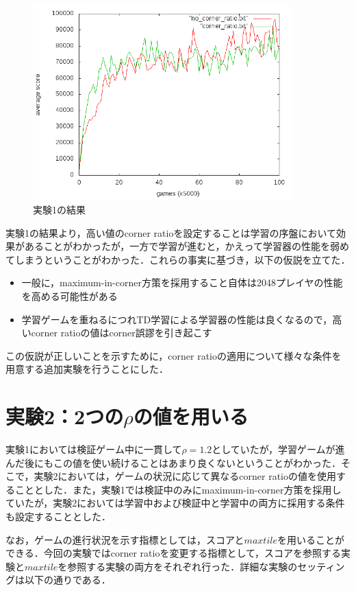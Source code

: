 \documentclass{suribt}
\begin{document}
\begin{figure}[t]
	\begin{center}
	\includegraphics[width=10cm]{figure_006.png}
	\caption{実験1の結果}
	\label{figure_006}
	\end{center}
\end{figure}

実験1の結果より，高い値のcorner ratioを設定することは学習の序盤において効果があることがわかったが，一方で学習が進むと，かえって学習器の性能を弱めてしまうということがわかった．これらの事実に基づき，以下の仮説を立てた．

\begin{itemize}
\item 一般に，maximum-in-corner方策を採用すること自体は2048プレイヤの性能を高める可能性がある
\item 学習ゲームを重ねるにつれTD学習による学習器の性能は良くなるので，高いcorner ratioの値はcorner誤謬を引き起こす
\end{itemize}

この仮説が正しいことを示すために，corner ratioの適用について様々な条件を用意する追加実験を行うことにした．

\section{実験2：2つの${\rho}$の値を用いる}
実験1においては検証ゲーム中に一貫して${\rho}=1.2$としていたが，学習ゲームが進んだ後にもこの値を使い続けることはあまり良くないということがわかった．そこで，実験2においては，ゲームの状況に応じて異なるcorner ratioの値を使用することとした．また，実験1では検証中のみにmaximum-in-corner方策を採用していたが，実験2においては学習中および検証中と学習中の両方に採用する条件も設定することとした．

なお，ゲームの進行状況を示す指標としては，スコアと$maxtile$を用いることができる．今回の実験ではcorner ratioを変更する指標として，スコアを参照する実験と$maxtile$を参照する実験の両方をそれぞれ行った．詳細な実験のセッティングは以下の通りである．
\end{document}
